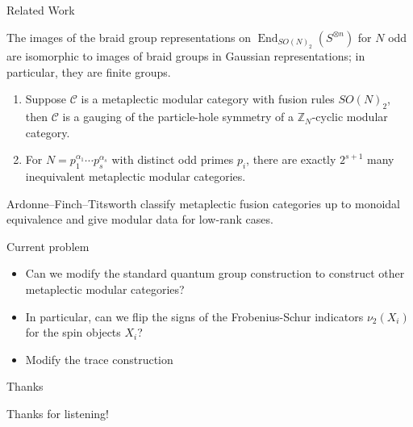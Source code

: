 \documentclass{beamer}
\DeclareMathOperator{\End}{End}
\begin{document}
\begin{frame}{Related Work}
\begin{theorem}
The images of the braid group representations on $\End_{SO(N)_2}(S^{\otimes n})$ for $N$ odd are isomorphic to images of braid groups in Gaussian representations; in particular, they are finite groups.
\end{theorem}

\begin{theorem}
\begin{enumerate}
\item Suppose $\mathcal{C}$ is a metaplectic modular category with fusion rules $SO(N)_2$, then $\mathcal{C}$ is a gauging of the particle-hole symmetry of a $\mathbb{Z}_N$-cyclic modular category.
\item For $N=p_1^{\alpha_1}\cdots p_s^{\alpha_s}$ with distinct odd primes $p_i$, there are exactly $2^{s+1}$ many inequivalent metaplectic modular categories.
\end{enumerate}
\end{theorem}

Ardonne--Finch--Titsworth classify metaplectic fusion categories up to monoidal equivalence and give modular data for low-rank cases.

\end{frame}

\begin{frame}{Current problem}
  \begin{itemize}
   \item Can we modify the standard quantum group construction to construct other metaplectic modular categories?
   \item In particular, can we flip the signs of the Frobenius-Schur indicators $\nu_2(X_i)$ for the spin objects $X_i$?
   \item Modify the trace construction
  \end{itemize}  
\end{frame}


\begin{frame}{Thanks}

Thanks for listening!

\end{frame}
\end{document}
